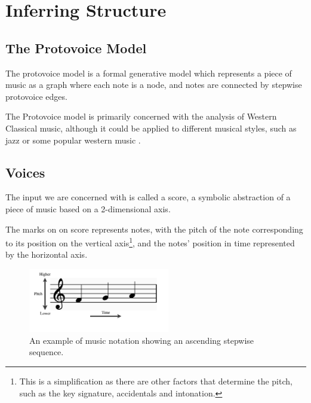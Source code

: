 \documentclass[12pt,a4paper,twoside,openright]{report}
\DeclareMathOperator*{\argmax}{arg\,max}
\theoremstyle{definition}
\begin{document}
\FloatBarrier
\section{Inferring Structure}
\subsection{The Protovoice Model}
The protovoice model is a formal generative model which represents a piece of music as a graph where each note is a node, and notes are connected by stepwise protovoice edges. 

The Protovoice model is primarily concerned with the analysis of Western Classical music, although it could be applied to different musical styles, such as jazz or some popular western music \cite{finkensiepStructureFreePolyphony2023}. 

\subsection{Voices}
The input we are concerned with is called a score, a symbolic abstraction of a piece of music based on a 2-dimensional axis.

The marks on on score represents notes, with the pitch of the note corresponding to its position on the vertical axis\footnote{This is a simplification as there are other factors that determine the pitch, such as the key signature, accidentals and intonation.}, and the notes' position in time represented by the horizontal axis.
\begin{figure}[h]
  \centering
  \includegraphics[width=0.55\textwidth]{prep/pitchTime.png}
  \captionsetup{width=.7\linewidth}
  \caption{An example of music notation showing an ascending stepwise sequence.}
  \label{fig:pitchTime}
\end{figure}
\end{document}
